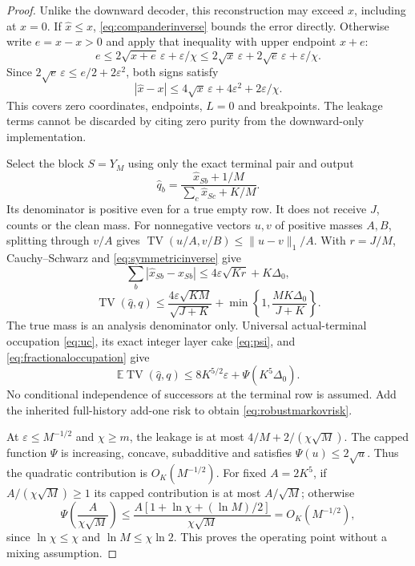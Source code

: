 \documentclass[11pt,letterpaper]{article}
\theoremstyle{definition}\newtheorem{definition}[theorem]{Definition}
\theoremstyle{remark}\newtheorem{remark}[theorem]{Remark}
\newcommand{\TV}{\operatorname{TV}}
\newcommand{\E}{\mathbb{E}}
\begin{document}
\begin{proof}
Unlike the downward decoder, this reconstruction may exceed $x$, including at $x=0$. If $\widehat x\le x$, \eqref{eq:companderinverse} bounds the error directly. Otherwise write $e=\widehat x-x>0$ and apply that inequality with upper endpoint $x+e$:
\[
 e\le2\sqrt{x+e}\,\varepsilon+\varepsilon/\chi
 \le2\sqrt x\,\varepsilon+2\sqrt e\,\varepsilon+\varepsilon/\chi.
\]
Since $2\sqrt e\,\varepsilon\le e/2+2\varepsilon^2$, both signs satisfy
\begin{equation}\label{eq:symmetricinverse}
 |\widehat x-x|\le4\sqrt x\,\varepsilon+4\varepsilon^2+2\varepsilon/\chi.
\end{equation}
This covers zero coordinates, endpoints, $L=0$ and breakpoints. The leakage terms cannot be discarded by citing zero purity from the downward-only implementation.

Select the block $S=Y_M$ using only the exact terminal pair and output
\[
 \widehat q_b=\frac{\widehat x_{Sb}+1/M}{\sum_c\widehat x_{Sc}+K/M}.
\]
Its denominator is positive even for a true empty row. It does not receive $J$, counts or the clean mass. For nonnegative vectors $u,v$ of positive masses $A,B$, splitting through $v/A$ gives
$\TV(u/A,v/B)\le\|u-v\|_1/A$.
With $r=J/M$, Cauchy--Schwarz and \eqref{eq:symmetricinverse} give
\[
 \sum_b|\widehat x_{Sb}-x_{Sb}|
 \le4\varepsilon\sqrt{Kr}+K\Delta_0,
\]
\[
 \TV(\widehat q,q)\le
 \frac{4\varepsilon\sqrt{KM}}{\sqrt{J+K}}
 +\min\left\{1,\frac{MK\Delta_0}{J+K}\right\}.
\]
The true mass is an analysis denominator only. Universal actual-terminal occupation \eqref{eq:uc}, its exact integer layer cake \eqref{eq:psi}, and \eqref{eq:fractionaloccupation} give
\[
 \E\TV(\widehat q,q)\le8K^{5/2}\varepsilon+\Psi(K^5\Delta_0).
\]
No conditional independence of successors at the terminal row is assumed. Add the inherited full-history add-one risk to obtain \eqref{eq:robustmarkovrisk}.

At $\varepsilon\le M^{-1/2}$ and $\chi\ge m$, the leakage is at most $4/M+2/(\chi\sqrt M)$. The capped function $\Psi$ is increasing, concave, subadditive and satisfies $\Psi(u)\le2\sqrt u$. Thus the quadratic contribution is $O_K(M^{-1/2})$. For fixed $A=2K^5$, if $A/(\chi\sqrt M)\ge1$ its capped contribution is at most $A/\sqrt M$; otherwise
\[
 \Psi\left(\frac A{\chi\sqrt M}\right)
 \le\frac{A[1+\ln\chi+(\ln M)/2]}{\chi\sqrt M}
 =O_K(M^{-1/2}),
\]
since $\ln\chi\le\chi$ and $\ln M\le\chi\ln2$. This proves the operating point without a mixing assumption.
\end{proof}
\end{document}
